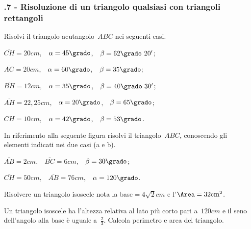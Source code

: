 \subsubsection*{\thechapter.7 - Risoluzione di un triangolo qualsiasi con triangoli rettangoli}

\begin{esercizio}
\label{ese:G.22}
Risolvi il triangolo acutangolo~$ABC$ nei seguenti casi.
\begin{multicols}{2}
\begin{enumeratea}
\item $\overline{CH}=20\unit{cm}$,~~$\alpha=45\grado$,~~$\beta=62\grado~20'$;
\item $\overline{AC}=20\unit{cm}$,~~$\alpha=60\grado$,~~$\beta=35\grado$;
\item $\overline{BH}=12\unit{cm}$,~~$\alpha=35\grado$,~~$\beta=40\grado~30'$;
\item $\overline{AH}=22,25\unit{cm}$,~~$\alpha=20\grado$,~~$\beta=65\grado$;
\item $\overline{CH}=10\unit{cm}$,~~$\alpha=42\grado$,~~$\beta=53\grado$.
\end{enumeratea}
\end{multicols}
\end{esercizio}

\begin{esercizio}
\label{ese:G.23}
In riferimento alla seguente figura risolvi il triangolo~$ABC$, conoscendo gli elementi indicati nei due casi (a e b).
\begin{center}
  
\end{center}
\begin{multicols}{2}
 \begin{enumeratea}
\item $\overline{AB}=2\unit{cm}$,~~$\overline{BC}=6\unit{cm}$,~~$\beta=30\grado$;
\item $\overline{CH}=50\unit{cm}$,~~$\overline{AB}=76\unit{cm}$,~~$\alpha=120\grado$.
\end{enumeratea}
\end{multicols}
\end{esercizio}

\begin{multicols}{2}
\begin{esercizio}
\label{ese:G.24}
Risolvere un triangolo isoscele nota la base$=4\sqrt{2}\unit{cm}$ e l'$\Area=32\unit{cm^2}$.
\end{esercizio}

\begin{esercizio}
\label{ese:G.25}
Un triangolo isoscele ha l'altezza relativa al lato più corto pari a~$120\unit{cm}$ e il seno dell'angolo alla base è uguale a~$\frac{2}{3}$.
Calcola perimetro e area del triangolo.
\end{esercizio}
\end{multicols}


